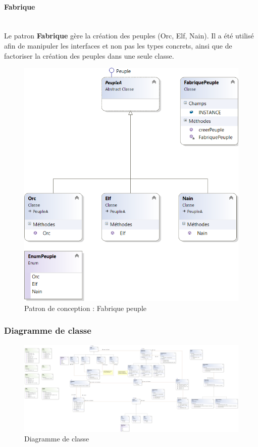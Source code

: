 \documentclass[a4paper,11pt]{article}
\begin{document}
\paragraph{Fabrique}\mbox{}\medskip\\
Le patron \textbf{Fabrique} gère la création des peuples (Orc, Elf, Nain). Il a été utilisé afin de manipuler les interfaces et non pas les types concrets, ainsi que de factoriser la création des peuples dans une seule classe.
\begin{figure}[H]
	\centering
	\includegraphics[width=\textwidth]{fig/fabrique_peuple}
	\caption{Patron de conception : Fabrique peuple}
	\label{pc:fp}
\end{figure}

\subsubsection{Diagramme de classe}
\begin{figure}[H]
	\centering
	\includegraphics[width=\textwidth]{fig/diagramme_de_classe}
	\caption{Diagramme de classe}
	\label{dc}
\end{figure}
\end{document}
